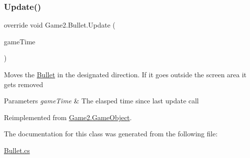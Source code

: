 \subsubsection{\texorpdfstring{Update()}{Update()}}
{\footnotesize\ttfamily override void Game2.\+Bullet.\+Update (\begin{DoxyParamCaption}\item[{Game\+Time}]{game\+Time }\end{DoxyParamCaption})\hspace{0.3cm}{\ttfamily [virtual]}}



Moves the \mbox{\hyperlink{class_game2_1_1_bullet}{Bullet}} in the designated direction. If it goes outside the screen area it gets removed 


\begin{DoxyParams}{Parameters}
{\em game\+Time} & The elasped time since last update call\\
\hline
\end{DoxyParams}


Reimplemented from \mbox{\hyperlink{class_game2_1_1_game_object_a360a294d8a55dcc747c44f8cc1aefe28}{Game2.\+Game\+Object}}.



The documentation for this class was generated from the following file\+:\begin{DoxyCompactItemize}
\item 
\mbox{\hyperlink{_bullet_8cs}{Bullet.\+cs}}\end{DoxyCompactItemize}
